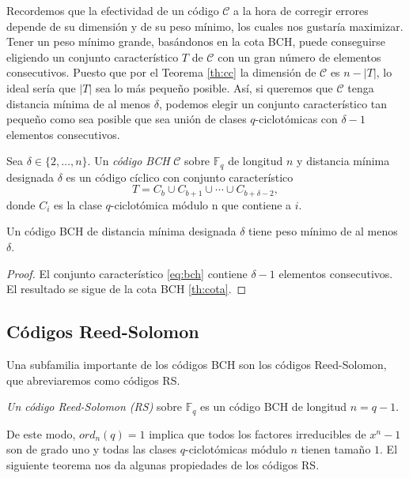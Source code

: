 Recordemos que la efectividad de un código $\mathcal{C}$ a la hora de corregir errores depende de su dimensión y de su peso mínimo, los cuales nos gustaría maximizar. Tener un peso mínimo grande, basándonos en la cota BCH, puede conseguirse eligiendo un conjunto característico $T$ de $\mathcal{C}$ con un gran número de elementos consecutivos. Puesto que por el Teorema \ref{th:cc} la dimensión de $\mathcal{C}$ es $n - |T|$, lo ideal sería que $|T|$ sea lo más pequeño posible. Así, si queremos que $\mathcal{C}$ tenga distancia mínima de al menos $\delta$, podemos elegir un conjunto característico tan pequeño como sea posible que sea unión de clases $q$-ciclotómicas con $\delta - 1$ elementos consecutivos.

\begin{definicion}
Sea $\delta \in \{2,\dots,n\}$.  Un \emph{código BCH} $\mathcal{C}$ sobre $\mathbb{F}_q$ de longitud $n$ y distancia mínima designada $\delta$ es un código cíclico con conjunto característico 
\begin{equation}\label{eq:bch}T = C_b \cup C_{b+1} \cup \cdots \cup C_{b+\delta-2},\end{equation} donde $C_i$ es la clase $q$-ciclotómica módulo n que contiene a $i$.
\end{definicion}

\begin{teorema}\label{th:bch}
Un código BCH de distancia mínima designada $\delta$ tiene peso mínimo de al menos $\delta$.
\end{teorema}

\begin{proof}
El conjunto característico \eqref{eq:bch} contiene $\delta - 1$ elementos consecutivos. El resultado se sigue de la cota BCH \ref{th:cota}.
\end{proof}

\subsection{Códigos Reed-Solomon}\label{subsec:rs}

Una subfamilia importante de los códigos BCH son los códigos Reed-Solomon, que abreviaremos como códigos RS.

\begin{definicion}
\emph{Un código Reed-Solomon (RS)} sobre $\mathbb{F}_q$ es un código BCH de longitud $n = q-1$.
\end{definicion}

De este modo, $ord_n(q) = 1$ implica que todos los factores irreducibles de $x^n-1$ son de grado uno y todas las clases $q$-ciclotómicas módulo $n$ tienen tamaño $1$. El siguiente teorema nos da algunas propiedades de los códigos RS.

